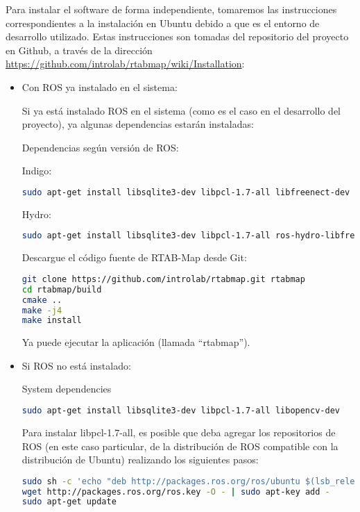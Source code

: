 Para instalar el software de forma independiente, tomaremos las instrucciones correspondientes a la instalación en Ubuntu debido a que es el entorno de desarrollo utilizado. Estas instrucciones son tomadas del repositorio del proyecto en Github, a través de la dirección \url{https://github.com/introlab/rtabmap/wiki/Installation}:

\begin{itemize}
	\item Con ROS ya instalado en el sistema:

	Si ya está instalado ROS en el sistema (como es el caso en el desarrollo del proyecto), ya algunas dependencias estarán instaladas:

	Dependencias según versión de ROS:

	Indigo:
	\begin{lstlisting}[language=bash]
sudo apt-get install libsqlite3-dev libpcl-1.7-all libfreenect-dev libopencv-dev
	\end{lstlisting}

	Hydro:
	\begin{lstlisting}[language=bash]
sudo apt-get install libsqlite3-dev libpcl-1.7-all ros-hydro-libfreenect ros-hydro-opencv2
	\end{lstlisting}

	Descargue el código fuente de RTAB-Map desde Git:

	\begin{lstlisting}[language=bash]
git clone https://github.com/introlab/rtabmap.git rtabmap
cd rtabmap/build
cmake ..
make -j4
make install
	\end{lstlisting}

	Ya puede ejecutar la aplicación (llamada ``rtabmap'').

	\item Si ROS no está instalado:

	System dependencies

	\begin{lstlisting}[language=bash]
sudo apt-get install libsqlite3-dev libpcl-1.7-all libopencv-dev
	\end{lstlisting}

	Para instalar libpcl-1.7-all, es posible que deba agregar los repositorios de ROS (en este caso particular, de la distribución de ROS compatible con la distribución de Ubuntu) realizando los siguientes pasos:

	\begin{lstlisting}[language=bash]
sudo sh -c 'echo "deb http://packages.ros.org/ros/ubuntu $(lsb_release -sc) main" > /etc/apt/sources.list.d/ros-latest.list'
wget http://packages.ros.org/ros.key -O - | sudo apt-key add -
sudo apt-get update
	\end{lstlisting}


\end{itemize}
